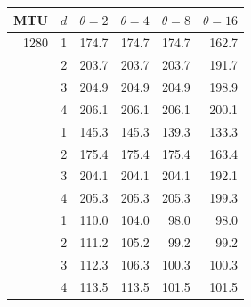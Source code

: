 \begin{tabular}{@{}rrrrrr@{}}
\toprule
MTU & $d$ & $\theta{=}2$ & $\theta{=}4$ & $\theta{=}8$ & $\theta{=}16$ \\
\midrule
1280 & 1 & 174.7 & 174.7 & 174.7 & 162.7 \\
 & 2 & 203.7 & 203.7 & 203.7 & 191.7 \\
 & 3 & 204.9 & 204.9 & 204.9 & 198.9 \\
 & 4 & 206.1 & 206.1 & 206.1 & 200.1 \\
\addlinespace
1500 & 1 & 145.3 & 145.3 & 139.3 & 133.3 \\
 & 2 & 175.4 & 175.4 & 175.4 & 163.4 \\
 & 3 & 204.1 & 204.1 & 204.1 & 192.1 \\
 & 4 & 205.3 & 205.3 & 205.3 & 199.3 \\
\addlinespace
9000 & 1 & 110.0 & 104.0 & 98.0 & 98.0 \\
 & 2 & 111.2 & 105.2 & 99.2 & 99.2 \\
 & 3 & 112.3 & 106.3 & 100.3 & 100.3 \\
 & 4 & 113.5 & 113.5 & 101.5 & 101.5 \\
\bottomrule
\end{tabular}
